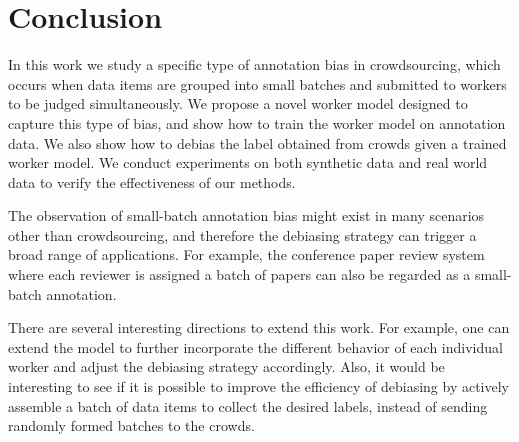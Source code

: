 \section{Conclusion}
\label{sec:conclusion}

In this work we study a specific type of annotation bias in crowdsourcing, 
which occurs when data items are grouped into small batches 
and submitted to workers to be judged simultaneously.  
We propose a novel worker model designed to capture this type of bias, 
and show how to train the worker model on annotation data.  
We also show how to debias the label obtained from crowds given a trained worker model.  
We conduct experiments on both synthetic data and real world data to verify the effectiveness of our methods.  

The observation of small-batch annotation bias might exist in many scenarios other than crowdsourcing, 
and therefore the debiasing strategy can trigger a broad range of applications. 
For example, the conference paper review system where each reviewer is assigned a batch of papers 
can also be regarded as a small-batch annotation.  

There are several interesting directions to extend this work.  
For example, one can extend the model to further incorporate the different behavior of each individual worker  
and adjust the debiasing strategy accordingly.  
Also, it would be interesting to see if it is possible to improve the efficiency of debiasing 
by actively assemble a batch of data items to collect the desired labels, 
instead of sending randomly formed batches to the crowds.  


